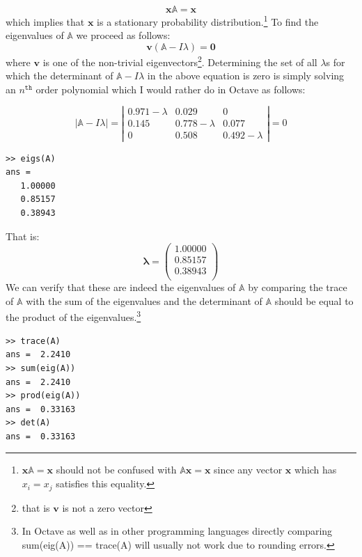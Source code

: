 \documentclass[a4paper,12pt]{article}
\theoremstyle{definition}
\begin{document}
\begin{equation}
\mathbf{x}\mathbb{A} = \mathbf{x}
\end{equation}
which implies that $\mathbf{x}$ is a stationary probability distribution.\footnote{$\mathbf{x}\mathbb{A} = \mathbf{x}$ should not be confused with $\mathbb{A}\mathbf{x} = \mathbf{x}$ since any vector $\mathbf{x}$ which has $x_i = x_j$ satisfies this equality.}
To find the eigenvalues of $\mathbb{A}$ we proceed as follows:
\begin{equation*}
\mathbf{v}(\mathbb{A}-I\lambda ) = \mathbf{0} 
\end{equation*}
where $\mathbf{v}$ is one of the non-trivial eigenvectors\footnote{that is $\mathbf{v}$ is not a zero vector}. Determining the set of all $\lambda$s for which the determinant of $\mathbb{A}-I\lambda $ in the above equation is zero is simply solving an $n^{\texttt{th}}$ order polynomial which I would rather do in Octave as follows: 

\begin{equation*}
\left| \mathbb{A}-I\lambda \right| = \left| \begin{array}{ccc}
0.971-\lambda & 0.029 & 0 \\
0.145 & 0.778-\lambda & 0.077 \\
0 & 0.508 & 0.492-\lambda
\end{array} \right| =0
\end{equation*}

\begin{lstlisting}
>> eigs(A)
ans =
   1.00000
   0.85157
   0.38943
\end{lstlisting}

That is:
\begin{equation*}
\mathbf{\lambda} = \left(\begin{array}{c}
   1.00000 \\
   0.85157 \\
   0.38943 \\
\end{array} \right)
\end{equation*}
We can verify that these are indeed the eigenvalues of $\mathbb{A}$ by comparing the trace of $\mathbb{A}$ with the sum of the eigenvalues and the determinant of $\mathbb{A}$ should be equal to the product of the eigenvalues.\footnote{In Octave as well as in other programming languages directly comparing sum(eig(A)) == trace(A) will usually not work due to rounding errors.} 
\begin{lstlisting}
>> trace(A)
ans =  2.2410
>> sum(eig(A))
ans =  2.2410
>> prod(eig(A))
ans =  0.33163
>> det(A)
ans =  0.33163
\end{lstlisting}
\end{document}
